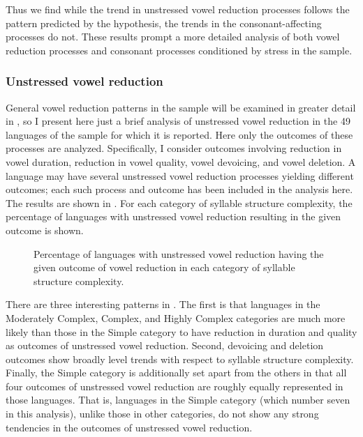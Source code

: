   Thus we find while the trend in unstressed vowel reduction processes follows the pattern predicted by the hypothesis, the trends in the consonant-affecting processes do not. These results prompt a more detailed analysis of both vowel reduction processes and consonant processes conditioned by stress in the sample.

\subsubsection{{Unstressed} {vowel} {reduction}}\label{sec:5.4.3.1}

  General vowel reduction patterns in the sample will be examined in greater detail in , so I present here just a brief analysis of unstressed vowel reduction in the 49 languages of the sample for which it is reported. Here only the outcomes of these processes are analyzed. Specifically, I consider outcomes involving reduction in vowel duration, reduction in vowel quality, vowel devoicing, and vowel deletion. A language may have several unstressed vowel reduction processes yielding different outcomes; each such process and outcome has been included in the analysis here. The results are shown in . For each category of syllable structure complexity, the percentage of languages with unstressed vowel reduction resulting in the given outcome is shown.

\begin{figure}
\caption{\label{fig:5.3} Percentage of languages with unstressed vowel reduction having the given outcome of vowel reduction in each category of syllable structure complexity.}
\end{figure}

  There are three interesting patterns in . The first is that languages in the  Moderately Complex, Complex, and Highly Complex categories are much more likely than those in the Simple category to have reduction in duration and quality as outcomes of unstressed vowel reduction. Second, devoicing and deletion outcomes show broadly level trends with respect to syllable structure complexity. Finally, the Simple category is additionally set apart from the others in that all four outcomes of unstressed vowel reduction are roughly equally represented in those languages. That is, languages in the Simple category (which number seven in this analysis), unlike those in other categories, do not show any strong tendencies in the outcomes of unstressed vowel reduction.

